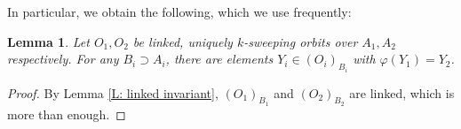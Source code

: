 \documentclass{amsart}
\newtheorem{lemma}[theorem]{Lemma}
\newtheorem{proposition}[theorem]{Proposition}
\theoremstyle{definition}
\begin{document}
In particular, we obtain the following, which we use frequently:

\begin{lemma}\label{L: weak linked}
    Let $O_1,O_2$ be linked, uniquely $k$-sweeping orbits over $A_1,A_2$ respectively. For any $B_i\supset A_i$, there are elements $Y_i\in(O_i)_{B_i}$ with $\varphi(Y_1)=Y_2$.
\end{lemma}
\begin{proof}
     By Lemma \ref{L: linked invariant}, $(O_1)_{B_1}$ and $(O_2)_{B_2}$ are linked, which is more than enough.
\end{proof}

\end{document}
